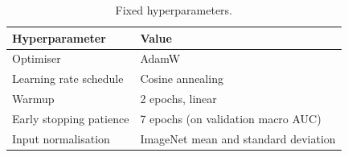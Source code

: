 \begin{table}[h]
\centering
\caption{Fixed hyperparameters.}
\label{tab:fixed_hparams}
\begin{tabular}{ll}
\toprule
Hyperparameter & Value \\
\midrule
Optimiser & AdamW~\cite{loshchilov2019} \\
Learning rate schedule & Cosine annealing~\cite{loshchilov2017} \\
Warmup & 2 epochs, linear~\cite{goyal2017} \\
Early stopping patience & 7 epochs (on validation macro AUC) \\
Input normalisation & ImageNet mean and standard deviation \\
\bottomrule
\end{tabular}
\end{table}
